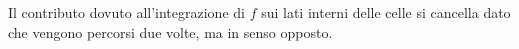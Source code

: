 \documentclass[preview]{standalone}
\begin{document}
\begin{center}
Il contributo dovuto all'integrazione di $f$ sui lati interni delle celle si cancella dato che vengono percorsi due volte, ma in senso opposto.
\end{center}
\end{document}
